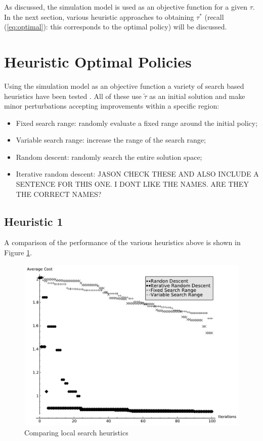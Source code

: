\documentclass[12pt]{article}
\begin{document}
As discussed, the simulation model is used as an objective function for a given $\tau$.
In the next section, various heuristic approaches to obtaining $\tau^*$ (recall (\ref{eq:optimal}): this corresponds to the optimal policy) will be discussed.

\section{Heuristic Optimal Policies}\label{heuristicoptimalpolicies}

Using the simulation model as an objective function a variety of search based heuristics have been tested \cite{}. All of these use $\tilde\tau$ as an initial solution and make minor perturbations accepting improvements within a specific region:

\begin{itemize}
    \item Fixed search range: randomly evaluate a fixed range around the initial policy;
    \item Variable search range: increase the range of the search range;
    \item Random descent: randomly search the entire solution space;
    \item Iterative random descent: JASON CHECK THESE AND ALSO INCLUDE A SENTENCE FOR THIS ONE. I DONT LIKE THE NAMES. ARE THEY THE CORRECT NAMES?
\end{itemize}

\subsection{Heuristic 1}\label{heuristic1}

A comparison of the performance of the various heuristics above is shown in Figure \ref{basicsearch}.

\begin{figure}[!hbtp]
    \begin{center}
        \includegraphics[width=.6\textwidth]{Images/Solver_Comp.pdf}
    \end{center}
    \caption{Comparing local search heuristics}\label{basicsearch}
\end{figure}
\end{document}
